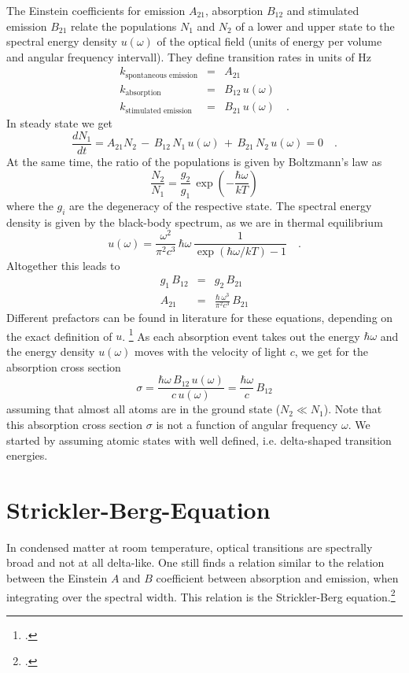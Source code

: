The Einstein coefficients for emission $A_{21}$, absorption $B_{12}$ and stimulated emission $B_{21}$ relate the populations $N_1$ and $N_2$ of a lower and upper state to the spectral energy density $u(\omega)$ of the optical field (units of energy per volume and angular frequency intervall). They define transition rates in units of Hz
\begin{eqnarray*}
 k_{\text{spontaneous emission}} &=& A_{21} \\
  k_{\text{absorption}}  & = & B_{12} \,   u(\omega) \\
  k_{\text{stimulated emission }} & =&  B_{21} \,  u(\omega)  \quad .
\end{eqnarray*}
%
In steady state we get
\[
 \frac{d N_1}{dt} =  A_{21} N_2 \, - \, B_{12} \, N_1 \, u(\omega) \, + \, B_{21}\, N_2 \,u(\omega)  = 0 \quad .
\]
At the same time, the ratio of the populations is given by Boltzmann's law as
\[
 \frac{N_2}{N_1} = \frac{g_2}{g_1} \, \exp \left( - \frac{\hbar \omega}{kT} \right)
\]
where the $g_i$ are the degeneracy of the respective state. The spectral energy density is given by the black-body spectrum, as we are in thermal equilibrium
\[
 u(\omega) = \frac{\omega^2}{\pi^2 c^3} \, \hbar \omega \, \frac{1}{\exp \left( \hbar \omega / kT \right) - 1} \quad .
\]
Altogether this leads to 
\begin{eqnarray*}
 g_1 \, B_{12} &=& g_2 \, B_{21} \\
 A_{21} &=&  \frac{\hbar \, \omega^3}{\pi^2 c^3} \, B_{21} 
\end{eqnarray*}
Different prefactors can be found in literature for these equations, depending on the exact definition of $u$.
 \footcite{Hilborn:2002wj} 
 As each absorption event takes out the energy $\hbar \omega$ and the energy density $u(\omega)$ moves with the velocity of light $c$, we get for the absorption cross section
\[
 \sigma = \frac{\hbar \omega \, B_{12} \, u(\omega)  }{c \, u(\omega) }  =
   \frac{\hbar \omega  }{c  }    \, B_{12}
\]
assuming that almost all atoms are in the ground state ($N_2 \ll N_1$). Note that this absorption cross section $\sigma$ is not a function of angular frequency $\omega$. We started by assuming atomic states with well defined, i.e. delta-shaped transition energies.



\section{Strickler-Berg-Equation} 


In condensed matter at room temperature, optical transitions are spectrally broad and not at all delta-like. One still finds a relation similar to the relation between the Einstein $A$ and $B$ coefficient between absorption and emission, when integrating over the spectral width. This relation is the  Strickler-Berg equation.\footcite[chapter 5.3][]{Strickler_Berg, Parson}  


